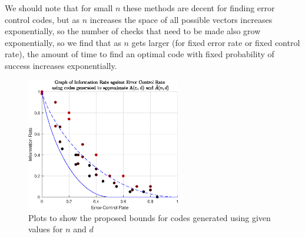 \documentclass[11pt]{article} %
\begin{document}
We should note that for small $n$ these methods are decent for finding error control codes, but as $n$ increases the space of all possible vectors increases exponentially, so the number of checks that need to be made also grow exponentially, so we find that as $n$ gets larger (for fixed error rate or fixed control rate), the amount of time to find an optimal code with fixed probability of success increases exponentially.

\begin{figure}[!h]
	\centering
	\includegraphics[width=0.6\textwidth]{"../MatLab File/Q5 graph"}
	\caption{Plots to show the proposed bounds for codes generated using given values for $n$ and $d$}
	\label{fig:3}
\end{figure}
\end{document}
